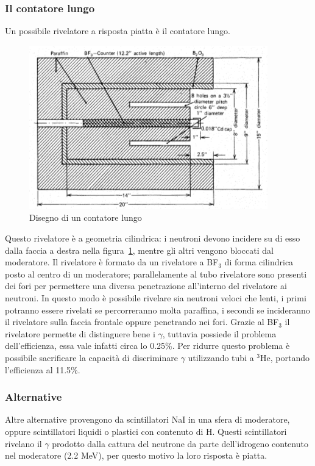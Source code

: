 \subsubsection{Il contatore lungo}
Un possibile rivelatore a risposta piatta \`e il contatore lungo.
\begin{figure}[htbp]
\begin{center}
\includegraphics[scale=1]{./Immagini/ContatoreLungo.png}
\caption{Disegno di un contatore lungo}
\label{fig:contatoreLungo}
\end{center}
\end{figure}
Questo rivelatore \`e a geometria cilindrica: i neutroni devono incidere su di esso dalla faccia a destra nella figura~\ref{fig:contatoreLungo}, mentre
gli altri vengono bloccati dal moderatore.
Il rivelatore \`e formato da un rivelatore a BF$_3$ di forma cilindrica posto al centro di un moderatore;
parallelamente al tubo rivelatore sono presenti dei fori per permettere una diversa penetrazione all'interno del rivelatore ai neutroni.
In questo modo \`e possibile rivelare sia neutroni veloci che lenti, i primi potranno essere rivelati se percorreranno molta paraffina,
i secondi se incideranno il rivelatore sulla faccia frontale oppure penetrando nei fori.
Grazie al BF$_3$ il rivelatore permette di distinguere bene i $\gamma$, tuttavia possiede il problema dell'efficienza, essa vale infatti circa
lo 0.25\%.
Per ridurre questo problema \`e possibile sacrificare la capacit\`a di discriminare $\gamma$ utilizzando tubi a $^3$He, portando l'efficienza
al 11.5\%.
\subsubsection{Alternative}
Altre alternative provengono da scintillatori NaI in una sfera di moderatore, oppure scintillatori liquidi o plastici con contenuto di H.
Questi scintillatori rivelano il $\gamma$ prodotto dalla cattura del neutrone da parte dell'idrogeno contenuto nel moderatore (2.2 MeV),
per questo motivo la loro risposta \`e piatta.
